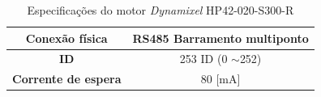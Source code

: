 \documentclass[
12pt,					%
openright,				%
twoside,				%
a4paper,				%
english,
brazil
]{ABNT/abntex2_report}
\begin{document}
\begin{table}[H]
\begin{adjustbox}{max width=\textwidth}
\begin{tabular}{|c|c|}
		\rowcolor[HTML]{EFEFEF} 
		{\color[HTML]{000000} \textbf{Conexão física}}                                              & {\color[HTML]{000000} RS485 Barramento multiponto}                                              \\ \hline
		\rowcolor[HTML]{FFFFFF} 
		{\color[HTML]{000000} \textbf{ID}}                                                          & {\color[HTML]{000000} 253 ID (0 $\sim$252)}                                                     \\ \hline
		\rowcolor[HTML]{EFEFEF} 
		{\color[HTML]{000000} \textbf{Corrente de espera}}                                          & {\color[HTML]{000000} 80 {[}mA{]}}                                                              \\ \hline
		\end{tabular}
		\end{adjustbox}
		\caption{Especificações do motor \textit{Dynamixel} HP42-020-S300-R}
		\end{table}
\end{document}
